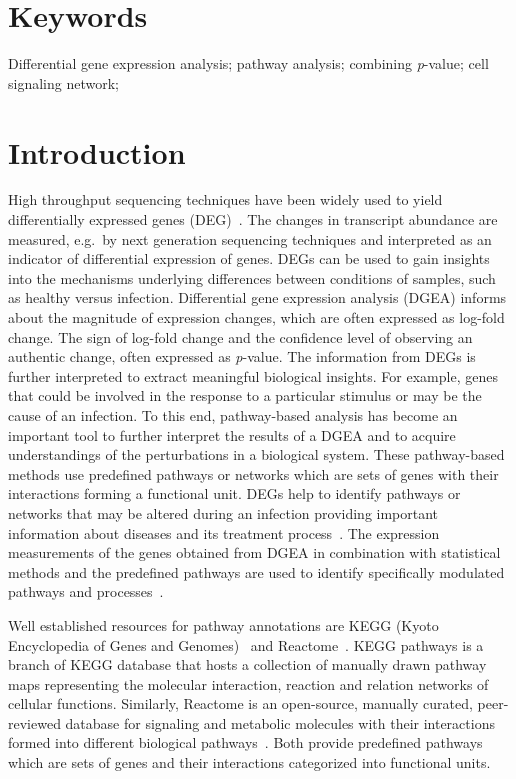 \documentclass[10pt,a4paper,twocolumn]{article}
\begin{document}
	\section*{Keywords}
	
	Differential gene expression analysis; pathway analysis; combining \textit{p}-value; cell signaling network;
	
	\clearpage
	
	\section*{Introduction}
	
	High throughput sequencing techniques have been widely used to yield
	differentially expressed genes (DEG)~\cite{DEG}. The changes in
	transcript abundance are measured, e.g.~by next generation sequencing
	techniques and interpreted as an indicator of differential expression of
	genes. DEGs can be used to gain insights into the mechanisms underlying differences between conditions of samples, such as healthy versus infection. Differential gene expression analysis (DGEA) informs about the
	magnitude of expression changes, which are often
	expressed as log-fold change. The sign of log-fold change and the confidence level of
	observing an authentic change, often expressed as \textit{p}-value. The information from DEGs is further interpreted to extract meaningful biological
	insights. For example, genes that could be involved in the response to a
	particular stimulus or may be the cause of an infection. To this end, pathway-based analysis has become an important tool to further interpret
	the results of a DGEA and to acquire understandings of the perturbations in
	a biological system. These pathway-based methods use predefined pathways or
	networks which are sets of genes with their
	interactions forming a functional unit. DEGs help to identify pathways or
	networks that may be altered during an infection providing
	important information about diseases and its treatment
	process~\cite{Khatri2012}. The
	expression measurements of the genes obtained from DGEA in combination with
	statistical methods and the predefined pathways are used to identify specifically modulated
	pathways and processes~\cite{Campos}. 
	
	
	Well established resources for pathway annotations are KEGG (Kyoto
	Encyclopedia of Genes and Genomes)~\cite{Kegg} and Reactome~\cite{Reactome}. KEGG pathways is a branch of KEGG database that
	hosts a collection of manually drawn pathway maps representing the
	molecular interaction, reaction and relation networks of cellular
	functions. Similarly, Reactome is an open-source, manually curated,
	peer-reviewed database for signaling and metabolic molecules with their
	interactions formed into different biological pathways~\cite{Reactome}. Both provide predefined pathways which are sets of
	genes and their interactions categorized into functional units.
	
\end{document}
